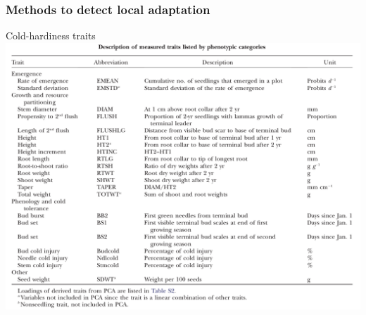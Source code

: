 \begin{frame}
\frametitle{Methods to detect local adaptation}
\begin{block}{Cold-hardiness traits}
\centering
\includegraphics[height=0.8\textheight]{eckert2.png}
\end{block}
\end{frame}


